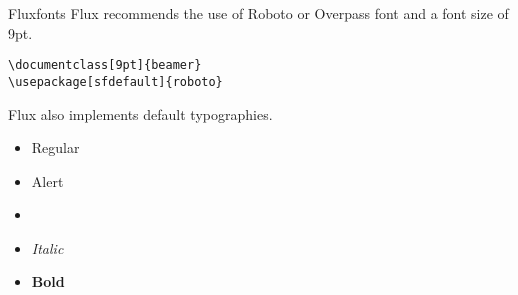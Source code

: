 \begin{frame}[fragile]{Flux}{fonts}
 Flux recommends the use of Roboto or Overpass font and a font size of 9pt.\\[0.2cm]
 \begin{center}
 	\verb+\documentclass[9pt]{beamer}+\\
	\verb+\usepackage[sfdefault]{roboto}+
 \end{center}
 
  Flux also implements default typographies.

	\begin{itemize}
		\item Regular
		\item \alert{Alert}
		\item {}
		\item \textit{Italic}
		\item \textbf{Bold}
	\end{itemize}
	
\end{frame}
